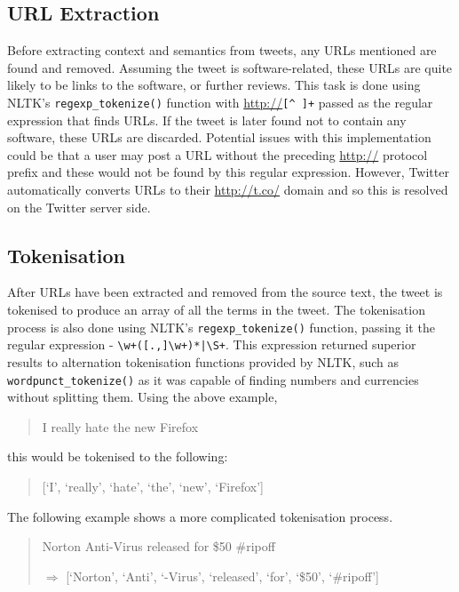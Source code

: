 \subsection{URL Extraction}
Before extracting context and semantics from tweets, any URLs mentioned are found and removed. Assuming the tweet is software-related, these URLs are quite likely to be links to the software, or further reviews. This task is done using NLTK's \texttt{regexp\_tokenize()} function with \url{http://}\verb/[^ ]+/ passed as the regular expression that finds URLs. If the tweet is later found not to contain any software, these URLs are discarded. Potential issues with this implementation could be that a user may post a URL without the preceding \url{http://} protocol prefix and these would not be found by this regular expression. However, Twitter automatically converts URLs to their \url{http://t.co/} domain and so this is resolved on the Twitter server side.

\subsection{Tokenisation}
After URLs have been extracted and removed from the source text, the tweet is tokenised to produce an array of all the terms in the tweet. The tokenisation process is also done using NLTK's \texttt{regexp\_tokenize()} function, passing it the regular expression - \verb/\w+([.,]\w+)*|\S+/. This expression returned superior results to alternation tokenisation functions provided by NLTK, such as \texttt{wordpunct\_tokenize()} as it was capable of finding numbers and currencies without splitting them. Using the above example,

\begin{quote}
I really hate the new Firefox
\end{quote}
this would be tokenised to the following:
\begin{quote}
[`I', `really', `hate', `the', `new', `Firefox']
\end{quote}

The following example shows a more complicated tokenisation process.
\begin{quote}
Norton Anti-Virus released for \$50 \#ripoff

\begin{math}\Rightarrow\end{math}
[`Norton', `Anti', `-Virus', `released', `for', `\$50', `\#ripoff']
\end{quote}

